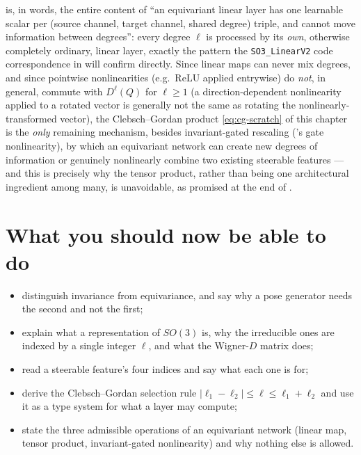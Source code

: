 \documentclass[11pt,a4paper]{report}
\theoremstyle{definition}
\theoremstyle{remark}
\newcommand{\pyfunc}[1]{\texttt{#1}}
\begin{document}
 is, in words, the entire content of ``an
equivariant linear layer has one learnable scalar per (source channel,
target channel, shared degree) triple, and cannot move information between
degrees'': every degree $\ell$ is processed by its \emph{own}, otherwise
completely ordinary, linear layer, exactly the pattern the
\pyfunc{SO3\_LinearV2} code correspondence in  will
confirm directly. Since linear maps can never mix degrees, and since
pointwise nonlinearities (e.g.\ $\mathrm{ReLU}$ applied entrywise) do
\emph{not}, in general, commute with $D^\ell(Q)$ for $\ell\ge1$ (a
direction-dependent nonlinearity applied to a rotated vector is generally
not the same as rotating the nonlinearly-transformed vector), the
Clebsch--Gordan product \eqref{eq:cg-scratch} of this chapter is the
\emph{only} remaining mechanism, besides invariant-gated rescaling
('s gate nonlinearity), by which an equivariant
network can create new degrees of information or genuinely nonlinearly
combine two existing steerable features --- and this is precisely why the
tensor product, rather than being one architectural ingredient among many,
is unavoidable, as promised at the end of .


\section{What you should now be able to do}

\begin{itemize}[nosep]
\item distinguish invariance from equivariance, and say why a pose generator needs the second and not the first;
\item explain what a representation of $SO(3)$ is, why the irreducible ones are indexed by a single integer $\ell$, and what the Wigner-$D$ matrix does;
\item read a steerable feature's four indices and say what each one is for;
\item derive the Clebsch--Gordan selection rule $|\ell_1-\ell_2|\le\ell\le\ell_1+\ell_2$ and use it as a type system for what a layer may compute;
\item state the three admissible operations of an equivariant network (linear map, tensor product, invariant-gated nonlinearity) and why nothing else is allowed.
\end{itemize}
\end{document}
